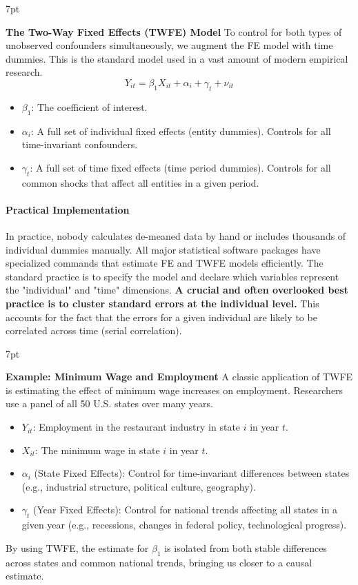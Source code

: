 \documentclass{article}
\providecommand{\tightlist}{
  \setlength{\itemsep}{0pt}
  \setlength{\parskip}{0pt}}
\newenvironment{greenblock}{%
\def\FrameCommand{%
  \hspace{1pt}%
    {\color{Green}%
    \vrule width 2pt}%
    {\color{greenshade}%
    \vrule width 4pt}%
  \colorbox{greenshade}%
}%
\MakeFramed{%
  \advance%
  \hsize-%
  \width%
  \FrameRestore}%
\noindent\hspace{-4.55pt}%
\begin{adjustwidth}{}{7pt}%
\vspace{2pt}\vspace{2pt}%
}
{%
\vspace{2pt}\end{adjustwidth}\endMakeFramed%
}
\newenvironment{redblock}{
\def\FrameCommand{
  \hspace{1pt}
    {\color{LightCoral}
    \vrule width 2pt}
    {\color{redshade}
    \vrule width 4pt}
  \colorbox{redshade}
}
\MakeFramed{
  \advance
  \hsize-
  \width
  \FrameRestore}
\noindent\hspace{-4.55pt}%
\begin{adjustwidth}{}{7pt}
\vspace{2pt}\vspace{2pt}
}
{\vspace{2pt}\end{adjustwidth}\endMakeFramed}
\begin{document}
\begin{greenblock}
\textbf{The Two-Way Fixed Effects (TWFE) Model}
To control for both types of unobserved confounders simultaneously, we augment the FE model with time dummies. This is the standard model used in a vast amount of modern empirical research.
\begin{equation}
    Y_{it} = \beta_1 X_{it} + \alpha_i + \gamma_t + \nu_{it}
\end{equation}
\begin{itemize}
    \tightlist
    \item $\beta_1$: The coefficient of interest.
    \item $\alpha_i$: A full set of individual fixed effects (entity dummies). Controls for all time-invariant confounders.
    \item $\gamma_t$: A full set of time fixed effects (time period dummies). Controls for all common shocks that affect all entities in a given period.
\end{itemize}
\end{greenblock}

\paragraph{Practical Implementation}
In practice, nobody calculates de-meaned data by hand or includes thousands of individual dummies manually. All major statistical software packages have specialized commands that estimate FE and TWFE models efficiently. The standard practice is to specify the model and declare which variables represent the "individual" and "time" dimensions. \textbf{A crucial and often overlooked best practice is to cluster standard errors at the individual level.} This accounts for the fact that the errors for a given individual are likely to be correlated across time (serial correlation).

\begin{redblock}
\textbf{Example: Minimum Wage and Employment}
A classic application of TWFE is estimating the effect of minimum wage increases on employment. Researchers use a panel of all 50 U.S. states over many years.
\begin{itemize}
    \item $Y_{it}$: Employment in the restaurant industry in state $i$ in year $t$.
    \item $X_{it}$: The minimum wage in state $i$ in year $t$.
    \item $\alpha_i$ (State Fixed Effects): Control for time-invariant differences between states (e.g., industrial structure, political culture, geography).
    \item $\gamma_t$ (Year Fixed Effects): Control for national trends affecting all states in a given year (e.g., recessions, changes in federal policy, technological progress).
\end{itemize}
By using TWFE, the estimate for $\beta_1$ is isolated from both stable differences across states and common national trends, bringing us closer to a causal estimate.
\end{redblock}
\end{document}
